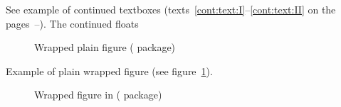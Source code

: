 \Text \Text


\clearpage

See example of continued textboxes (texts~\ref{cont:text:I}--\ref{cont:text:II}
 on the pages~\pageref{cont:text:I}--\pageref{cont:text:II}).
The continued floats
\ifodd\value{page}\else
\Text \Text

\Text \Text

\ifodd\value{page}\else
\Text \Text

\fi

\ifodd\value{page}\else
\Text \Text

\fi

\fi

\begin{sidewaystextbox*}
\wideemptyfloatpage
\ttextbox
{\TEXTBOX[ \Text \Text \par \Text \Text \text]}
{\caption{Beside text~I. \text}%
\label{cont:text:I}}%
\end{sidewaystextbox*}

\begin{sidewaystextbox*}
\wideemptyfloatpage\ContinuedFloat
{}
{\caption{\emph{Continued}}%
\label{cont:text:II}%
}%
{\TEXTBOX[ \text.]}%
\end{sidewaystextbox*}

\Text \Text \Text

\Text \Text

\Text \Text

\Text


\fi


\ifTwocolumn\else
\ifLoadWrapfig

\clearpage
\Text

\begin{figure}
{}
\caption{Wrapped plain figure
(\protect{} package)}\label{fig:wrapfig:WcatI}
\end{figure}

Example of plain wrapped figure (see figure~\ref{fig:wrapfig:WcatI}).
\Text
\Text

\Text

\clearpage
\Text
\begin{figure}
\ffigbox
{\par{}}
{\caption[Wrapped figure in \protect{}]{Wrapped figure in \protect{}
 (\protect{} package)\mpfootnotemark[1]}\label{fig:wrapfig:WcatII}}
\end{figure}

